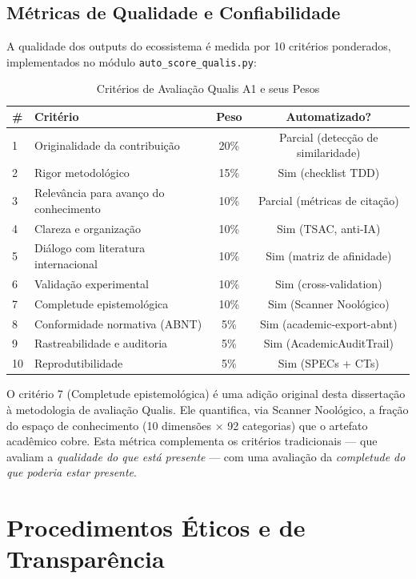 \subsection{Métricas de Qualidade e Confiabilidade}

A qualidade dos outputs do ecossistema é medida por 10 critérios ponderados, implementados no módulo \texttt{auto\_score\_qualis.py}:

\begin{table}[H]
\centering
\caption{Critérios de Avaliação Qualis A1 e seus Pesos}
\begin{tabular}{p{0.5cm}p{6cm}cc}
\toprule
\textbf{\#} & \textbf{Critério} & \textbf{Peso} & \textbf{Automatizado?} \\
\midrule
1 & Originalidade da contribuição & 20\% & Parcial (detecção de similaridade) \\
2 & Rigor metodológico & 15\% & Sim (checklist TDD) \\
3 & Relevância para avanço do conhecimento & 10\% & Parcial (métricas de citação) \\
4 & Clareza e organização & 10\% & Sim (TSAC, anti-IA) \\
5 & Diálogo com literatura internacional & 10\% & Sim (matriz de afinidade) \\
6 & Validação experimental & 10\% & Sim (cross-validation) \\
7 & Completude epistemológica & 10\% & Sim (Scanner Noológico) \\
8 & Conformidade normativa (ABNT) & 5\% & Sim (academic-export-abnt) \\
9 & Rastreabilidade e auditoria & 5\% & Sim (AcademicAuditTrail) \\
10 & Reprodutibilidade & 5\% & Sim (SPECs + CTs) \\
\bottomrule
\end{tabular}
\end{table}

O critério 7 (Completude epistemológica) é uma adição original desta dissertação à metodologia de avaliação Qualis. Ele quantifica, via Scanner Noológico, a fração do espaço de conhecimento (10 dimensões $\times$ 92 categorias) que o artefato acadêmico cobre. Esta métrica complementa os critérios tradicionais --- que avaliam a \textit{qualidade do que está presente} --- com uma avaliação da \textit{completude do que poderia estar presente}.

\section{Procedimentos Éticos e de Transparência}

